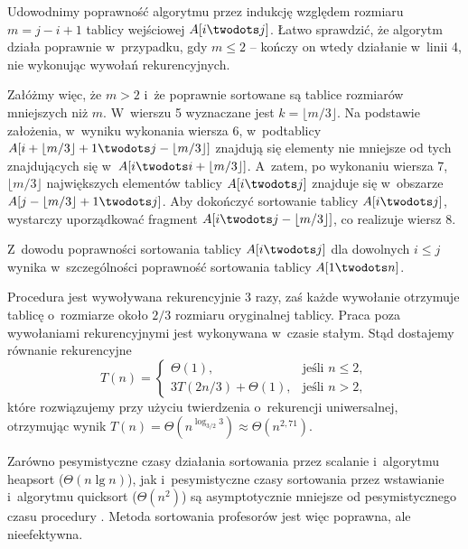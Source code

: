 
\subproblem %
Udowodnimy poprawność algorytmu przez indukcję względem rozmiaru $m=j-i+1$ tablicy wejściowej $A[i\twodots j]$.
Łatwo sprawdzić, że algorytm działa poprawnie w~przypadku, gdy $m\le2$ -- kończy on wtedy działanie w~linii 4, nie wykonując wywołań rekurencyjnych.

Załóżmy więc, że $m>2$ i~że poprawnie sortowane są tablice rozmiarów mniejszych niż $m$.
W~wierszu 5 wyznaczane jest $k=\lfloor m/3\rfloor$.
Na podstawie założenia, w~wyniku wykonania wiersza 6, w~podtablicy $A[i+\lfloor m/3\rfloor+1\twodots j-\lfloor m/3\rfloor]$ znajdują się elementy nie mniejsze od tych znajdujących się w~$A[i\twodots i+\lfloor m/3\rfloor]$.
A~zatem, po wykonaniu wiersza 7, $\lfloor m/3\rfloor$ największych elementów tablicy $A[i\twodots j]$ znajduje się w~obszarze $A[j-\lfloor m/3\rfloor+1\twodots j]$.
Aby dokończyć sortowanie tablicy $A[i\twodots j]$, wystarczy uporządkować fragment $A[i\twodots j-\lfloor m/3\rfloor]$, co realizuje wiersz 8.

Z~dowodu poprawności sortowania tablicy $A[i\twodots j]$ dla dowolnych $i\le j$ wynika w~szczególności poprawność sortowania tablicy $A[1\twodots n]$.

\subproblem %
Procedura jest wywoływana rekurencyjnie 3 razy, zaś każde wywołanie otrzymuje tablicę o~rozmiarze około $2/3$ rozmiaru oryginalnej tablicy.
Praca poza wywołaniami rekurencyjnymi jest wykonywana w~czasie stałym.
Stąd dostajemy równanie rekurencyjne
\[
	T(n) =
	\begin{cases}
		\Theta(1), & \text{jeśli $n\le2$}, \\
		3T(2n/3)+\Theta(1), & \text{jeśli $n>2$},
	\end{cases}
\]
które rozwiązujemy przy użyciu twierdzenia o~rekurencji uniwersalnej, otrzymując wynik $T(n)=\Theta(n^{\log_{3/2}3})\approx \Theta(n^{2{,}71})$.

\subproblem %
Zarówno pesymistyczne czasy działania sortowania przez scalanie i~algorytmu heapsort ($\Theta(n\lg n)$), jak i~pesymistyczne czasy sortowania przez wstawianie i~algorytmu quicksort ($\Theta(n^2)$) są asymptotycznie mniejsze od pesymistycznego czasu procedury .
Metoda sortowania profesorów jest więc poprawna, ale nieefektywna.
